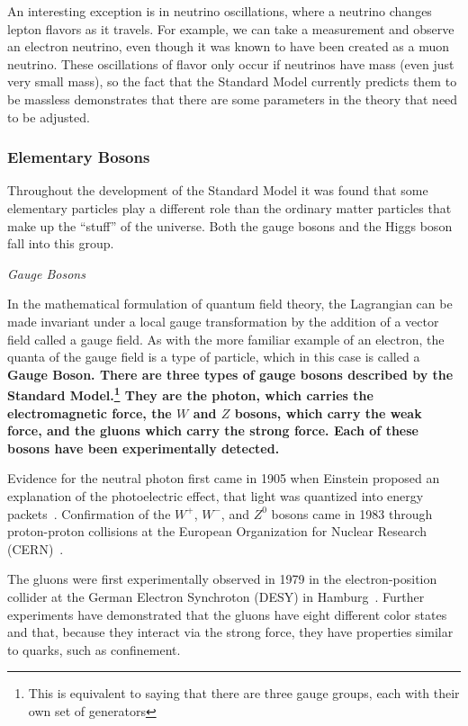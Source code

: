 \documentclass[12pt,epsf]{article}
\begin{document}
An interesting exception is in neutrino oscillations, where a neutrino
changes lepton flavors as it travels. For example, we can take a
measurement and observe an electron neutrino, even though it was known
to have been created as a muon neutrino. These oscillations of flavor
only occur if neutrinos have mass (even just very small mass), so the
fact that the Standard Model currently predicts them to be massless
demonstrates that there are some parameters in the theory that need to
be adjusted.

\subsubsection{Elementary Bosons}

Throughout the development of the Standard Model it was found that some
elementary particles play a different role than the ordinary matter
particles that make up the “stuff” of the universe. Both the gauge
bosons and the Higgs boson fall into this group. 

\begin{center}
\it Gauge Bosons \rm
\end{center}

In the mathematical formulation of quantum field theory, the Lagrangian
can be made invariant under a local gauge transformation by the
addition of a vector field called a gauge field.  As with the more
familiar example of an electron, the quanta of the gauge field is a
type of particle, which in this case is called a \bf Gauge Boson\rm. 
There are three types of gauge bosons described by the Standard
Model.\footnote{This is equivalent to saying that there are three gauge
groups, each with their own set of generators}  They are the photon,
which carries the electromagnetic force, the $W$ and $Z$ bosons, which
carry the weak force, and the gluons which carry the strong force. 
Each of these bosons have been experimentally detected.

Evidence for the neutral photon first came in 1905 when Einstein
proposed an explanation of the photoelectric effect, that light was
quantized into energy packets~\cite{Ford}.  Confirmation of the $W^+$,
$W^-$, and $Z^0$ bosons came in 1983 through proton-proton collisions at
the European Organization for Nuclear Research (CERN)~\cite{Ezhela}.  

The gluons were first experimentally observed in 1979 in the
electron-position collider at the German Electron Synchroton (DESY)
in Hamburg~\cite{Ezhela}.  Further experiments have demonstrated that
the gluons have eight different color states and that, because they
interact via the strong force, they have properties similar to quarks,
such as confinement.
\end{document}
